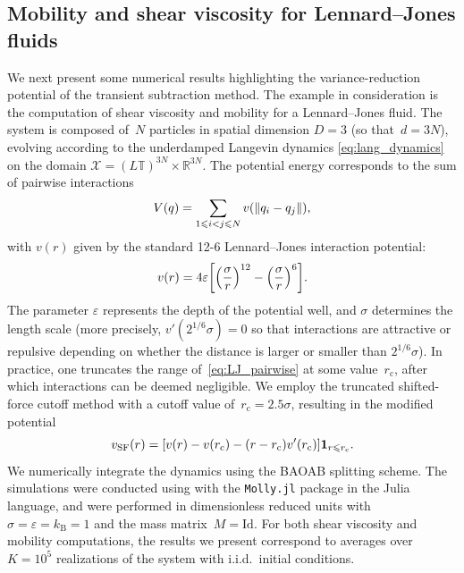 \documentclass[11pt]{article}
\newcommand{\T}{\mathbb{T}}
\newcommand{\R}{\mathbb{R}}
\newcommand{\ind}{\mathbf{1}}
\renewcommand{\leq}{\leqslant}
\DeclarePairedDelimiter\norm{\lVert}{\rVert}
\DeclarePairedDelimiter\paren{\lparen}{\rparen}
\DeclarePairedDelimiter\bkt{\lbrack}{\rbrack}
\theoremstyle{definition}
\begin{document}
\subsection{Mobility and shear viscosity for Lennard--Jones fluids}
\label{subsec:num_LJ}
We next present some numerical results highlighting the variance-reduction potential of the transient subtraction method. The example in consideration is the computation of shear viscosity and mobility for a Lennard--Jones fluid. The system is composed of~$N$ particles in spatial dimension $D=3$ (so that~$d=3N$), evolving according to the underdamped Langevin dynamics \eqref{eq:lang_dynamics} on the domain $\mathcal{X} = (L\T)^{3N} \times \R^{3N}$. The potential energy corresponds to the sum of pairwise interactions
\begin{equation}
    \notag
	V(q) = \sum_{1\leq i<j\leq N} v(\norm{q_i - q_j}),
\end{equation}
with $v(r)$ given by the standard 12-6 Lennard--Jones interaction potential:
\begin{equation}
	v(r) = 4\varepsilon\bkt*{\paren*{\frac{\sigma}{r}}^{12} - \paren*{\frac{\sigma}{r}}^6}.
	\label{eq:LJ_pairwise}
\end{equation}
The parameter $\varepsilon$ represents the depth of the potential well, and $\sigma$ determines the length scale (more precisely, $v'(2^{1/6}\sigma)=0$ so that interactions are attractive or repulsive depending on whether the distance is larger or smaller than $2^{1/6}\sigma$).
In practice, one truncates the range of~\eqref{eq:LJ_pairwise} at some value~$r_\mathrm{c}$, after which interactions can be deemed negligible. We employ the truncated shifted-force cutoff method with a cutoff value of~$r_\mathrm{c}=2.5\sigma$, resulting in the modified potential
\begin{equation}
    \notag
	v_\mathrm{SF}(r) = [v(r) - v(r_\mathrm{c}) - (r - r_\mathrm{c})v'(r_\mathrm{c})]\ind_{r\leq r_\mathrm{c}}.
\end{equation}
We numerically integrate the dynamics using the BAOAB splitting scheme. The simulations were conducted using with the \texttt{Molly.jl} package \cite{greener2024} in the Julia language, and were performed in dimensionless reduced units with $\sigma = \varepsilon = k_\mathrm{B} = 1$ and the mass matrix~$M = \mathrm{Id}$. For both shear viscosity and mobility computations, the results we present correspond to averages over $K = 10^5$ realizations of the system with i.i.d.\ initial conditions. 
\end{document}
